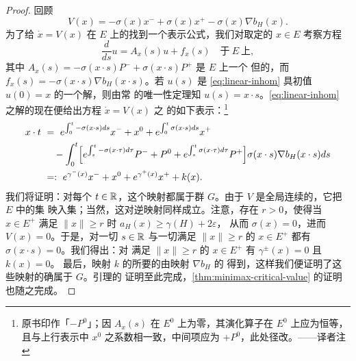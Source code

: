 \begin{proof}
回顾
\begin{equation}\label{eq:V-formula}
V(x)=-\sigma(x)x^{-}+\sigma(x)x^{+}-\sigma(x)\nabla b_{H}(x).
\end{equation}
为了给 $\dot{x}=V(x)$ 在 $E$ 上的\trFlow{}找到一个表示公式，我们对取定的%
$x\in E$ 考察方程
\begin{equation}\label{eq:linear-inhom}
\frac{d}{ds}u=A_{x}(s)u+f_{x}(s)\quad\text{于}\ E\ \text{上},
\end{equation}
其中 $A_{x}(s)=-\sigma(x\cdot s)P^{-}+\sigma(x\cdot s)P^{+}$ 是 $E$ 上一个%
\trTimeDependent{}但\trLinear{}的\trVectorField，而%
$f_{x}(s)=-\sigma(x\cdot s)\nabla b_{H}(x\cdot s)$。若 $u(s)$ 是%
\eqref{eq:linear-inhom} 具初值 $u(0)=x$ 的一个解，则由常%
\trDifferentialEquation{}的唯一性定理知 $u(s)=x\cdot s$。\eqref{eq:linear-inhom}%
之解的\trVariationOfConstantsFormula{}现在便给出方程 $\dot{x}=V(x)$ 之%
\trFlow{}的如下表示：\footnote{原书印作「$-P^{0}$」；因 $A_{x}(s)$ 在 $E^{0}$ 上为零，其演化算子在 $E^{0}$ 上应为恒等，且与上行表示中 $x^{0}$ 之系数相一致，中间项应为 $+P^{0}$，此处径改。——译者注}
\begin{align*}
x\cdot t\ &=\ e^{\int_{0}^{t}-\sigma(x\cdot s)ds}x^{-}+x^{0}+e^{\int_{0}^{t}\sigma(x\cdot s)ds}x^{+}\\
&\quad-\int_{0}^{t}\Bigl[e^{\int_{s}^{t}-\sigma(x\cdot\tau)d\tau}P^{-}+P^{0}+e^{\int_{s}^{t}\sigma(x\cdot\tau)d\tau}P^{+}\Bigr]\sigma(x\cdot s)\nabla b_{H}(x\cdot s)ds\\
&=:\ e^{\gamma^{-}(x)}x^{-}+x^{0}+e^{\gamma^{+}(x)}x^{+}+k(x).
\end{align*}
我们将证明：对每个 $t\in\mathbb{R}$，这个\trFlow{}映射都属于群 $G$。由于%
\trVectorField{} $V$ 是全局\trLipschitz{}连续的，它把 $E$ 中的\trBounded{}集%
映入\trBounded{}集；当然，这对逆映射同样成立。注意，存在 $r>0$，使得当%
$x\in E^{+}$ 满足 $\lVert x\rVert\geq r$ 时 $a_{H}(x)\geq\gamma(H)+2\varepsilon$，%
从而 $\sigma(x)=0$，进而 $V(x)=0$。于是，对一切 $s\in\mathbb{R}$ 与一切满足%
$\lVert x\rVert\geq r$ 的 $x\in E^{+}$ 都有 $\sigma(x\cdot s)=0$。我们得出：对%
满足 $\lVert x\rVert\geq r$ 的 $x\in E^{+}$ 有 $\gamma^{\pm}(x)=0$ 且 $k(x)=0$。%
最后，映射 $k$ 的所要的\trCompactness{}由映射 $\nabla b_{H}$ 的%
\trCompactness{}得到，这样我们便证明了这些\trFlow{}映射的确属于 $G$。引理的%
证明至此完成，\cref{thm:minimax-critical-value} 的证明也随之完成。
\end{proof}
